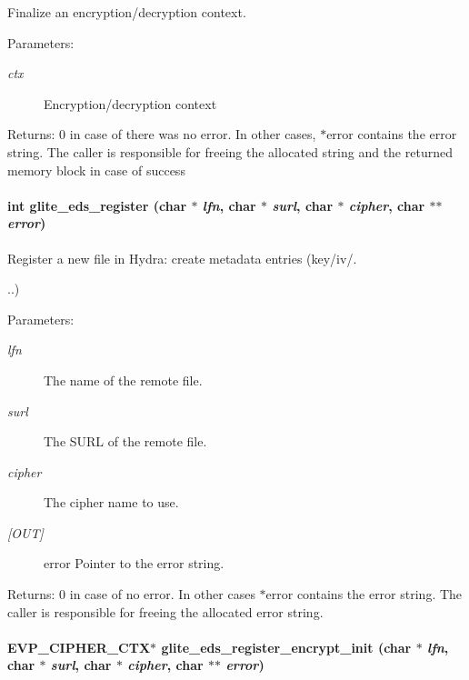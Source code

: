 Finalize an encryption/decryption context. 

\begin{Desc}
\item[Parameters:]
\begin{description}
\item[{\em ctx}]Encryption/decryption context\end{description}
\end{Desc}
\begin{Desc}
\item[Returns:]0 in case of there was no error. In other cases, $\ast$error contains the error string. The caller is responsible for freeing the allocated string and the returned memory block in case of success \end{Desc}
\hypertarget{eds-simple_8h_a0}{
\paragraph[glite\_\-eds\_\-register]{\setlength{\rightskip}{0pt plus 5cm}int glite\_\-eds\_\-register (char $\ast$ {\em lfn}, char $\ast$ {\em surl}, char $\ast$ {\em cipher}, char $\ast$$\ast$ {\em error})}\hfill}
\label{eds-simple_8h_a0}


Register a new file in Hydra: create metadata entries (key/iv/. 

..)

\begin{Desc}
\item[Parameters:]
\begin{description}
\item[{\em lfn}]The name of the remote file. \item[{\em surl}]The SURL of the remote file. \item[{\em cipher}]The cipher name to use. \item[{\em \mbox{[}OUT\mbox{]}}]error Pointer to the error string.\end{description}
\end{Desc}
\begin{Desc}
\item[Returns:]0 in case of no error. In other cases $\ast$error contains the error string. The caller is responsible for freeing the allocated error string. \end{Desc}
\hypertarget{eds-simple_8h_a1}{
\paragraph[glite\_\-eds\_\-register\_\-encrypt\_\-init]{\setlength{\rightskip}{0pt plus 5cm}EVP\_\-CIPHER\_\-CTX$\ast$ glite\_\-eds\_\-register\_\-encrypt\_\-init (char $\ast$ {\em lfn}, char $\ast$ {\em surl}, char $\ast$ {\em cipher}, char $\ast$$\ast$ {\em error})}\hfill}
\label{eds-simple_8h_a1}


